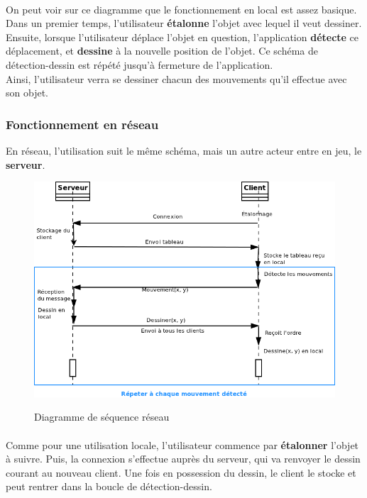 \documentclass{report}
\begin{document}
				\paragraph{}
				On peut voir sur ce diagramme que le fonctionnement en local est assez basique. Dans un premier temps, l'utilisateur \textbf{étalonne} l'objet avec lequel il veut dessiner. Ensuite, lorsque l'utilisateur déplace l'objet en question, l'application \textbf{détecte} ce déplacement, et \textbf{dessine} à la nouvelle position de l'objet. Ce schéma de détection-dessin est répété jusqu'à fermeture de l'application. \\
				Ainsi, l'utilisateur verra se dessiner chacun des mouvements qu'il effectue avec son objet.

				\newpage
				\subsubsection{Fonctionnement en réseau}
				En réseau, l'utilisation suit le même schéma, mais un autre acteur entre en jeu, le \textbf{serveur}.
				\begin{figure}[!h]
						\centering
						\includegraphics[scale=0.62]{../images/sequence_reseau.png}\\
						\caption{Diagramme de séquence réseau}
						\label{Diagramme de séquence réseau}
				\end{figure}
				\paragraph{}
				Comme pour une utilisation locale, l'utilisateur commence par \textbf{étalonner} l'objet à suivre. Puis, la connexion s'effectue auprès du serveur, qui va renvoyer le dessin courant au nouveau client. Une fois en possession du dessin, le client le stocke et peut rentrer dans la boucle de détection-dessin.
\end{document}
